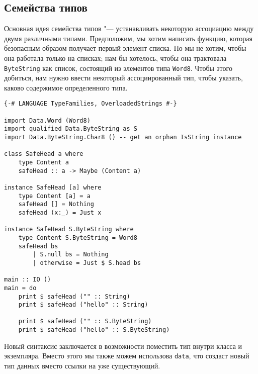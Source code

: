 \subsection{Семейства типов}

Основная идея семейства типов "--- устанавливать некоторую ассоциацию между двумя различными типами. Предположим, мы хотим написать функцию, которая безопасным образом получает первый элемент списка. Но мы не хотим, чтобы она работала только на списках; нам бы хотелось, чтобы она трактовала \lstinline'ByteString' как список, состоящий из элементов типа \lstinline'Word8'. Чтобы этого добиться, нам нужно ввести некоторый ассоциированный тип, чтобы указать, каково содержимое определенного типа.

\begin{lstlisting}
{-# LANGUAGE TypeFamilies, OverloadedStrings #-}

import Data.Word (Word8)
import qualified Data.ByteString as S
import Data.ByteString.Char8 () -- get an orphan IsString instance

class SafeHead a where
    type Content a
    safeHead :: a -> Maybe (Content a)

instance SafeHead [a] where
    type Content [a] = a
    safeHead [] = Nothing
    safeHead (x:_) = Just x

instance SafeHead S.ByteString where
    type Content S.ByteString = Word8
    safeHead bs
        | S.null bs = Nothing
        | otherwise = Just $ S.head bs

main :: IO ()
main = do
    print $ safeHead ("" :: String)
    print $ safeHead ("hello" :: String)

    print $ safeHead ("" :: S.ByteString)
    print $ safeHead ("hello" :: S.ByteString)
\end{lstlisting}

Новый синтаксис заключается в возможности поместить тип внутри класса и экземпляра. Вместо этого мы также можем использова \lstinline'data', что создаст новый тип данных вместо ссылки на уже существующий.

